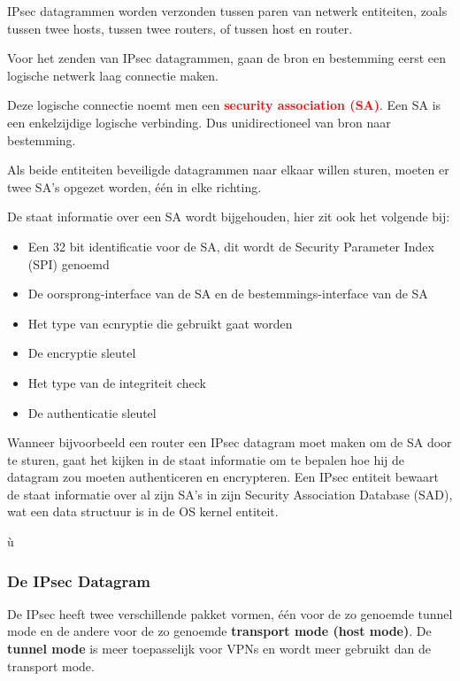 \noindent IPsec datagrammen worden verzonden tussen paren van netwerk entiteiten, zoals tussen twee hosts, tussen twee routers, of tussen host en router.

\noindent Voor het zenden van IPsec datagrammen, gaan de bron en bestemming eerst een logische netwerk laag connectie maken.

\noindent Deze logische connectie noemt men een \textcolor{red}{\textbf{security association (SA)}}. Een SA is een enkelzijdige logische verbinding. Dus unidirectioneel van bron naar bestemming.

\noindent Als beide entiteiten beveiligde datagrammen naar elkaar willen sturen, moeten er twee SA’s opgezet worden, één in elke richting.

\noindent De staat informatie over een SA wordt bijgehouden, hier zit ook het volgende bij:
\begin{itemize}
\item Een 32 bit identificatie voor de SA, dit wordt de Security Parameter Index (SPI) genoemd
\item De oorsprong-interface van de SA en de bestemmings-interface van de SA
\item Het type van ecnryptie die gebruikt gaat worden
\item De encryptie sleutel
\item Het type van de integriteit check
\item De authenticatie sleutel
\end{itemize}

\noindent Wanneer bijvoorbeeld een router een IPsec datagram moet maken om de SA door te sturen, gaat het kijken in de staat informatie om te bepalen hoe hij de datagram zou moeten authenticeren en encrypteren.
Een IPsec entiteit bewaart de staat informatie over al zijn SA’s in zijn Security Association Database (SAD), wat een data structuur is in de OS kernel entiteit.

ù\clearpage

\subsubsection{De IPsec Datagram}

De IPsec heeft twee verschillende pakket vormen, één voor de zo genoemde tunnel mode en de andere voor de zo genoemde \textbf{transport mode (host mode)}. De \textbf{tunnel mode} is meer toepasselijk voor VPNs en wordt meer gebruikt dan de transport mode.

